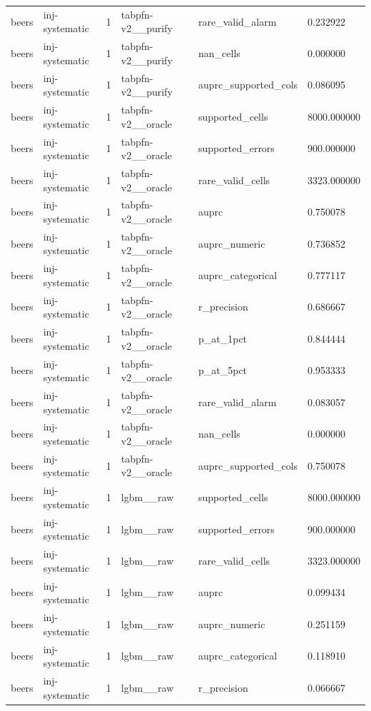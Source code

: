 \begin{tabular}{llllll}
beers & inj-systematic & 1 & tabpfn-v2\_\_purify & rare\_valid\_alarm & 0.232922 \\
beers & inj-systematic & 1 & tabpfn-v2\_\_purify & nan\_cells & 0.000000 \\
beers & inj-systematic & 1 & tabpfn-v2\_\_purify & auprc\_supported\_cols & 0.086095 \\
beers & inj-systematic & 1 & tabpfn-v2\_\_oracle & supported\_cells & 8000.000000 \\
beers & inj-systematic & 1 & tabpfn-v2\_\_oracle & supported\_errors & 900.000000 \\
beers & inj-systematic & 1 & tabpfn-v2\_\_oracle & rare\_valid\_cells & 3323.000000 \\
beers & inj-systematic & 1 & tabpfn-v2\_\_oracle & auprc & 0.750078 \\
beers & inj-systematic & 1 & tabpfn-v2\_\_oracle & auprc\_numeric & 0.736852 \\
beers & inj-systematic & 1 & tabpfn-v2\_\_oracle & auprc\_categorical & 0.777117 \\
beers & inj-systematic & 1 & tabpfn-v2\_\_oracle & r\_precision & 0.686667 \\
beers & inj-systematic & 1 & tabpfn-v2\_\_oracle & p\_at\_1pct & 0.844444 \\
beers & inj-systematic & 1 & tabpfn-v2\_\_oracle & p\_at\_5pct & 0.953333 \\
beers & inj-systematic & 1 & tabpfn-v2\_\_oracle & rare\_valid\_alarm & 0.083057 \\
beers & inj-systematic & 1 & tabpfn-v2\_\_oracle & nan\_cells & 0.000000 \\
beers & inj-systematic & 1 & tabpfn-v2\_\_oracle & auprc\_supported\_cols & 0.750078 \\
beers & inj-systematic & 1 & lgbm\_\_raw & supported\_cells & 8000.000000 \\
beers & inj-systematic & 1 & lgbm\_\_raw & supported\_errors & 900.000000 \\
beers & inj-systematic & 1 & lgbm\_\_raw & rare\_valid\_cells & 3323.000000 \\
beers & inj-systematic & 1 & lgbm\_\_raw & auprc & 0.099434 \\
beers & inj-systematic & 1 & lgbm\_\_raw & auprc\_numeric & 0.251159 \\
beers & inj-systematic & 1 & lgbm\_\_raw & auprc\_categorical & 0.118910 \\
beers & inj-systematic & 1 & lgbm\_\_raw & r\_precision & 0.066667 \\

\end{tabular}
